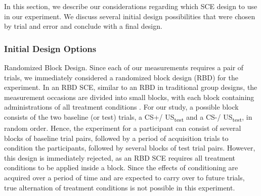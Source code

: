 \documentclass[empirical,issue, twocolumn,authordate]{jote-new-article}
\begin{document}
In this section, we describe our considerations regarding which SCE design to use in our experiment. We discuss several initial design possibilities that were chosen by trial and error and conclude with a final design.

\subsubsection{Initial Design Options}

Randomized Block Design. Since each of our measurements requires a pair of trials, we immediately considered a randomized block design (RBD) for the experiment. In an RBD SCE, similar to an RBD in traditional group designs, the measurement occasions are divided into small blocks, with each block containing administrations of all treatment conditions \parencite{Onghena2005}. For our study, a possible block consists of the two baseline (or test) trials, a CS+/ US\textsubscript{test} and a CS-/ US\textsubscript{test}, in random order. Hence, the experiment for a participant can consist of several blocks of baseline trial pairs, followed by a period of acquisition trials to condition the participants, followed by several blocks of test trial pairs. However, this design is immediately rejected, as an RBD SCE requires all treatment conditions to be applied inside a block. Since the effects of conditioning are acquired over a period of time and are expected to carry over to future trials, true alternation of treatment conditions is not possible in this experiment. 
\end{document}
